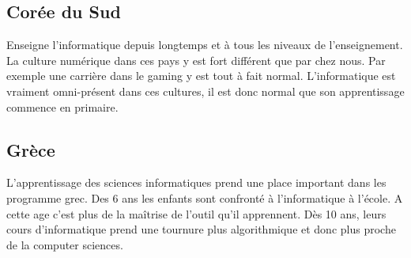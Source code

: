 \subsection{Corée du Sud}
Enseigne l'informatique depuis longtemps et à tous les niveaux de l'enseignement. La culture numérique dans ces pays y est fort différent que par chez nous. Par exemple une carrière dans le gaming y est tout à fait normal. L'informatique est vraiment omni-présent dans ces cultures, il est donc normal que son apprentissage commence en primaire.

\subsection{Grèce}
L'apprentissage des sciences informatiques prend une place important dans les programme grec. Des 6 ans les enfants sont confronté à l'informatique à l'école. A cette age c'est plus de la maîtrise de l'outil qu'il apprennent. Dès 10 ans, leurs cours d'informatique prend une tournure plus algorithmique et donc plus proche de la computer sciences.

